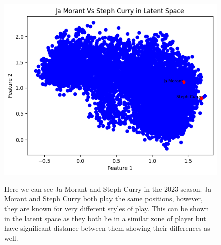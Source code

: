 \documentclass[12pt, letterpaper, titlepage]{article}
\begin{document}
\begin{figure}
  \begin{minipage}[b]{0.35\textwidth}
    \includegraphics[width=\linewidth]{morantcurry}
    \label{fig:morantcurry}
  \end{minipage}
  \hfill
  \begin{minipage}[b]{0.5\textwidth}
    Here we can see Ja Morant and Steph Curry in the 2023 season.  Ja Morant and Steph Curry both play the same positions, however, they are known for very different styles of play. This can be shown in the latent space as they both lie in a similar zone of player but have significant distance between them showing their differences as well.
  \end{minipage}




\end{figure}
\end{document}
